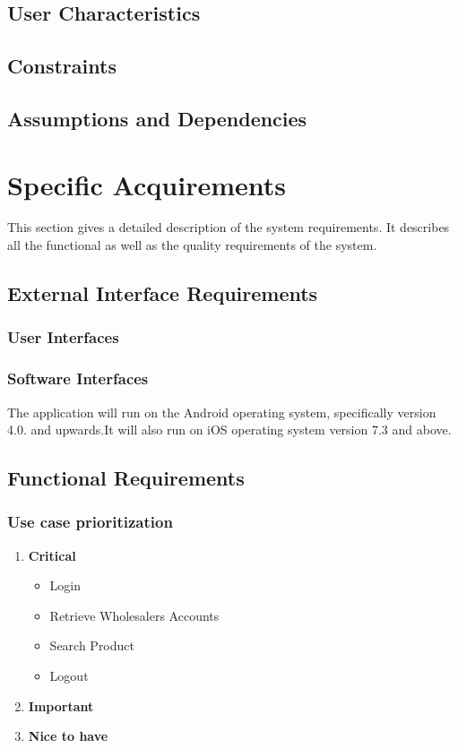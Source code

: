 \documentclass[a4paper,10pt]{article}
\begin{document}
	\subsection{User Characteristics}

	\subsection{Constraints}

	\subsection{Assumptions and Dependencies}

		
	\section{Specific Acquirements}
This section gives a detailed description of the system requirements. It describes all the functional as well as the quality requirements of the system.

	\subsection{External Interface Requirements}

                 \subsubsection{User Interfaces}

                 \subsubsection{Software Interfaces}
The application will run on the Android operating system, specifically version 4.0. and upwards.It will also run on iOS operating system version 7.3 and above.

	\subsection{Functional Requirements}
	\subsubsection{Use case prioritization} 
		\begin{enumerate} 
		\item \textbf{Critical} 
			\begin{itemize} 
				\item Login
				\item Retrieve Wholesalers Accounts 
				\item Search Product 
				\item Logout
			\end{itemize} 
		\item \textbf{Important} 

		\item \textbf{Nice to have} 
		\end{enumerate} 
\end{document}
